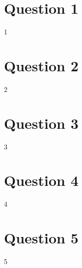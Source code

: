 \documentclass[12pt,a4paper]{article}
\begin{document}
\section*{Question 1}
	{1}
\section*{Question 2}
	{2}	
\section*{Question 3}
	{3}	
\section*{Question 4}
	{4}
\section*{Question 5}
	{5}
\end{document}
